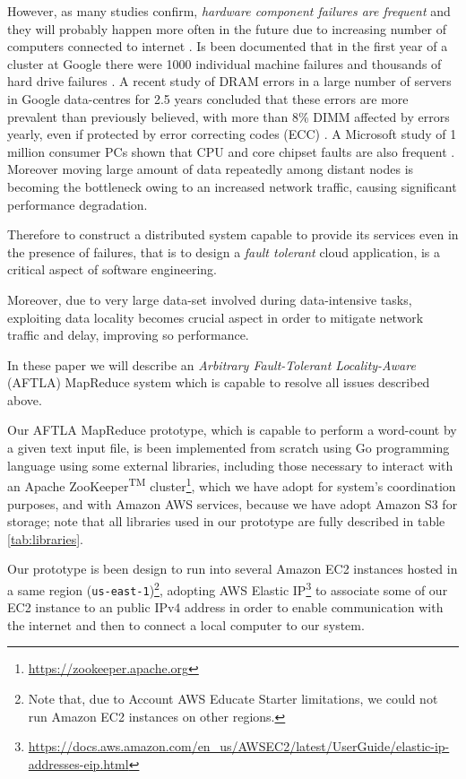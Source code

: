 \documentclass[sigchi]{acmart}
\begin{document}
However, as many studies confirm, \textit{hardware component failures are frequent} and they will probably happen more often in the future due to increasing number of computers connected to internet \citep{BFLMapReduce}. Is been documented that in the first year of a cluster at Google there were 1000 individual machine failures and thousands of hard drive failures \cite{PetaScaleFailure}. A recent study of DRAM errors in a large number of servers in Google data-centres for 2.5 years concluded that these errors are more prevalent than previously believed, with more than 8\% DIMM affected by errors yearly, even if protected by error correcting codes (ECC) \cite{DRAMError}. A Microsoft study of 1 million consumer PCs shown that CPU and core chipset faults are also frequent \cite{MicrosoftStudyFailure}. Moreover moving large amount of data repeatedly among distant nodes is becoming the bottleneck owing to an increased network traffic, causing significant performance degradation.

Therefore to construct a distributed system capable to provide its services even in the presence of failures, that is to design a \textit{fault tolerant} cloud application, is a critical aspect of software engineering.

Moreover, due to very large data-set involved during data-intensive tasks, exploiting data locality becomes crucial aspect in order to mitigate network traffic and delay, improving so performance.

In these paper we will describe an \textit{Arbitrary Fault-Tolerant Locality-Aware} (AFTLA) MapReduce system which is capable to resolve all issues described above. 

Our AFTLA MapReduce prototype, which is capable to perform a word-count by a given text input file, is been implemented from scratch using Go programming language using some external libraries, including those necessary to interact with an Apache ZooKeeper\textsuperscript{TM} cluster\footnote{\url{https://zookeeper.apache.org}}, which we have adopt for system's coordination purposes, and with Amazon AWS services, because we have adopt Amazon S3 for storage; note that all libraries used in our prototype are fully described in table \ref{tab:libraries}. 

Our prototype is been design to run into several Amazon EC2 instances hosted in a same region (\texttt{us-east-1})\footnote{Note that, due to Account AWS Educate Starter limitations, we could not run Amazon EC2 instances on other regions.}, adopting AWS Elastic IP\footnote{\url{https://docs.aws.amazon.com/en_us/AWSEC2/latest/UserGuide/elastic-ip-addresses-eip.html}} to associate some of our EC2 instance to an public IPv4 address in order to enable communication with the internet and then to connect a local computer to our system. 
\end{document}
